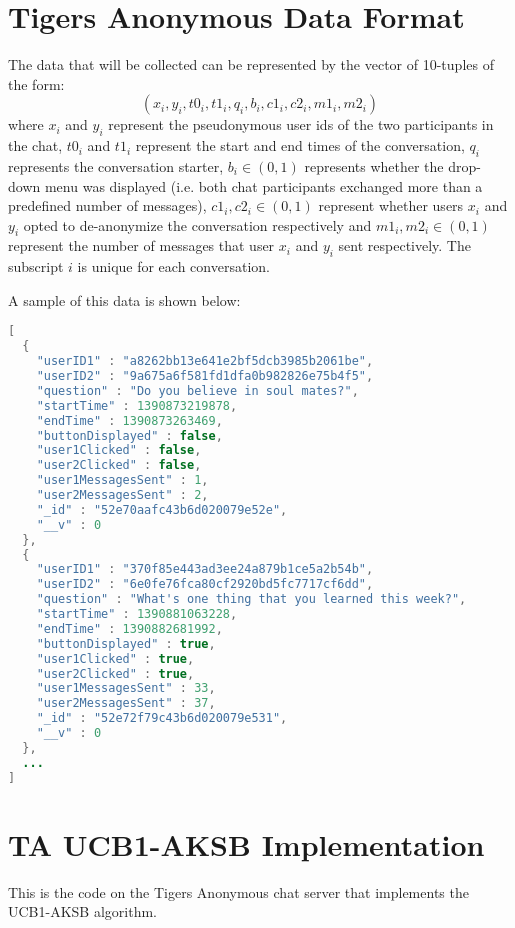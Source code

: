 \section{Tigers Anonymous Data Format}

The data that will be collected can be represented by the vector of 10-tuples of the form: $$(x_i, y_i, t0_i, t1_i, q_i, b_i, c1_i, c2_i, m1_i, m2_i)$$ where $x_i$ and $y_i$ represent the pseudonymous user ids of the two participants in the chat, $t0_i$ and $t1_i$ represent the start and end times of the conversation, $q_i$ represents the conversation starter, $b_i \in {(0, 1)}$ represents whether the drop-down menu was displayed (i.e. both chat participants exchanged more than a predefined number of messages), $c1_i, c2_i \in{(0, 1)}$ represent whether users $x_i$ and $y_i$ opted to de-anonymize the conversation respectively and $m1_i, m2_i \in{(0,1)}$ represent the number of messages that user $x_i$ and $y_i$ sent respectively. The subscript $i$ is unique for each conversation. 

A sample of this data is shown below: 

\begin{lstlisting}[language=java]
[
  { 
    "userID1" : "a8262bb13e641e2bf5dcb3985b2061be",
    "userID2" : "9a675a6f581fd1dfa0b982826e75b4f5",
    "question" : "Do you believe in soul mates?",
    "startTime" : 1390873219878,
    "endTime" : 1390873263469,
    "buttonDisplayed" : false,
    "user1Clicked" : false,
    "user2Clicked" : false,
    "user1MessagesSent" : 1,
    "user2MessagesSent" : 2,
    "_id" : "52e70aafc43b6d020079e52e",
    "__v" : 0
  },
  {
    "userID1" : "370f85e443ad3ee24a879b1ce5a2b54b",
    "userID2" : "6e0fe76fca80cf2920bd5fc7717cf6dd",
    "question" : "What's one thing that you learned this week?",
    "startTime" : 1390881063228,
    "endTime" : 1390882681992,
    "buttonDisplayed" : true,
    "user1Clicked" : true,
    "user2Clicked" : true,
    "user1MessagesSent" : 33,
    "user2MessagesSent" : 37,
    "_id" : "52e72f79c43b6d020079e531",
    "__v" : 0 
  }, 
  ...
]
\end{lstlisting}

\section{TA UCB1-AKSB Implementation}

This is the code on the Tigers Anonymous chat server that implements the UCB1-AKSB algorithm.


